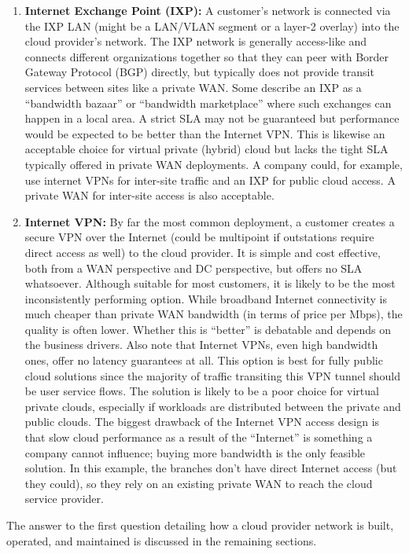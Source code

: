 \begin{enumerate}
  \item \textbf{Internet Exchange Point (IXP):} A customer’s network is
  connected via the IXP LAN (might be a LAN/VLAN segment or a layer-2 overlay)
  into the cloud provider’s network. The IXP network is generally access-like
  and connects different organizations together so that they can peer with
  Border Gateway Protocol (BGP) directly, but typically does not provide
  transit services between sites like a private WAN\@. Some describe an IXP as a
  ``bandwidth bazaar'' or ``bandwidth marketplace'' where such exchanges can
  happen in a local area. A strict SLA may not be guaranteed but performance
  would be expected to be better than the Internet VPN\@. This is likewise an
  acceptable choice for virtual private (hybrid) cloud but lacks the tight SLA
  typically offered in private WAN deployments. A company could, for example,
  use internet VPNs for inter-site traffic and an IXP for public cloud access.
  A private WAN for inter-site access is also acceptable.


  \item \textbf{Internet VPN:} By far the most common deployment, a customer
  creates a secure VPN over the Internet (could be multipoint if outstations
  require direct access as well) to the cloud provider. It is simple and cost
  effective, both from a WAN perspective and DC perspective, but offers no SLA
  whatsoever. Although suitable for most customers, it is likely to be the
  most inconsistently performing option. While broadband Internet connectivity
  is much cheaper than private WAN bandwidth (in terms of price per Mbps), the
  quality is often lower. Whether this is ``better'' is debatable and depends on
  the business drivers. Also note that Internet VPNs, even high bandwidth
  ones, offer no latency guarantees at all. This option is best for fully
  public cloud solutions since the majority of traffic transiting this VPN
  tunnel should be user service flows. The solution is likely to be a poor
  choice for virtual private clouds, especially if workloads are distributed
  between the private and public clouds. The biggest drawback of the Internet
  VPN access design is that slow cloud performance as a result of the
  ``Internet'' is something a company cannot influence; buying more bandwidth is
  the only feasible solution. In this example, the branches don’t have direct
  Internet access (but they could), so they rely on an existing private WAN to
  reach the cloud service provider.

\end{enumerate}

The answer to the first question detailing how a cloud provider network is
built, operated, and maintained is discussed in the remaining sections.
